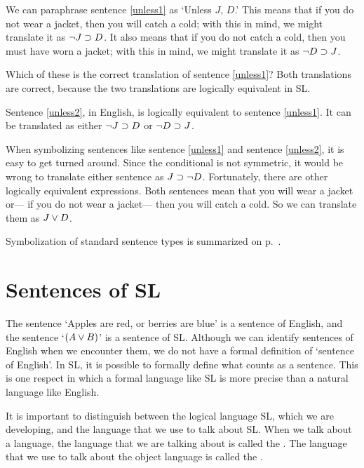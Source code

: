 We can paraphrase sentence \ref{unless1} as `Unless $J$, $D$.' This means that if you do not wear a jacket, then you will catch a cold; with this in mind, we might translate it as $\neg J \supset D$. It also means that if you do not catch a cold, then you must have worn a jacket; with this in mind, we might translate it as $\neg D \supset J$.

Which of these is the correct translation of sentence \ref{unless1}? Both translations are correct, because the two translations are logically equivalent in SL.

Sentence \ref{unless2}, in English, is logically equivalent to sentence \ref{unless1}. It can be translated as either $\neg J \supset D$ or $\neg D \supset J$.

When symbolizing sentences like sentence \ref{unless1} and sentence \ref{unless2}, it is easy to get turned around. Since the conditional is not symmetric, it would be wrong to translate either sentence as $J \supset \neg D$. Fortunately, there are other logically equivalent expressions. Both sentences mean that you will wear a jacket or--- if you do not wear a jacket--- then you will catch a cold. So we can translate them as $J \vee D$.



Symbolization of standard sentence types is summarized on p.~\pageref{app.symbolization}.





\section{Sentences of SL}
\label{sec:sentencesofSL}
The sentence `Apples are red, or berries are blue' is a sentence of English, and the sentence `$(A\vee B)$' is a sentence of SL. Although we can identify sentences of English when we encounter them, we do not have a formal definition of `sentence of English'. In SL, it is possible to formally define what counts as a sentence. This is one respect in which a formal language like SL is more precise than a natural language like English.

It is important to distinguish between the logical language SL, which we are developing, and the language that we use to talk about SL. When we talk about a language, the language that we are talking about is called the . The language that we use to talk about the object language is called the .
\label{def.metalanguage}

